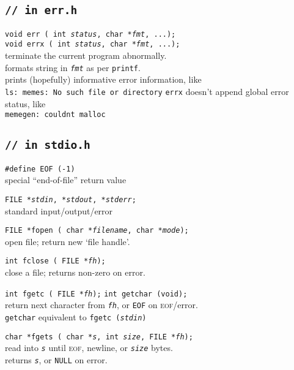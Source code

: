 \documentclass[8pt]{article}
\newcommand{\Cc}[1]{\texttt{#1}}
\newcommand{\cmt}[1]{\textcolor[gray]{.3}{\texttt{#1}}} %
\newcommand{\cpp}[1]{\textcolor{black!20!cyan}{\texttt{\##1}}} %
\newcommand{\ty}[1]{\textcolor{blue!80}{\texttt{#1}}} %
\newcommand{\kv}[1]{\textcolor{red!40!black}{\texttt{#1}}} %
\newcommand{\val}[1]{\texttt{#1}} %
\newcommand{\fn}[1]{\texttt{#1}} %
\newcommand{\var}[1]{\texttt{\textit{#1}}} %
\newcommand{\htab}{\hspace*{2em}} %
\newcommand{\Cq}{\textquotesingle} %
\begin{document}
\begin{multicols}{3}
\subsection*{\Cc{\cmt{// in err.h}}}

\Cc{\ty{void} \fn{err}\,(%
    \ty{int} \var{status}, %
    \ty{char *}\var{fmt}, ...);} \\
\Cc{\ty{void} \fn{errx}\,(%
    \ty{int} \var{status}, %
    \ty{char *}\var{fmt}, ...);} \\
\htab terminate the current program abnormally. \\
\htab formats string in \var{fmt} as per \fn{printf}. \\
\htab prints (hopefully) informative error information, like \\
\htab\htab\texttt{ls: memes: No such file or directory}
\htab \fn{errx} doesn't append global error status, like \\
\htab\htab\texttt{memegen: couldn\Cq t malloc}

\subsection*{\Cc{\cmt{// in stdio.h}}}

\Cc{\cpp{define} \kv{EOF} (\val{-1})} \\
\htab special ``end-of-file'' return value

\Cc{\ty{FILE *}\var{stdin}, \ty{*}\var{stdout}, \ty{*}\var{stderr};}\\
\htab standard input/output/error

\Cc{\ty{FILE *}\fn{fopen}\,(%
    \ty{char *}\var{filename},
    \ty{char *}\var{mode});}\\
\htab open file; return new `file handle'.

\Cc{\ty{int} \fn{fclose}\,(%
    \ty{FILE *}\var{fh});}\\
\htab close a file; returns non-zero on error.

\Cc{\ty{int} \fn{fgetc}\,(%
    \ty{FILE *}\var{fh});}\hfill
\Cc{\ty{int} \fn{getchar}\,(\ty{void});}\\
\htab return next character from \var{fh}, or \kv{EOF} on \textsc{eof}/error. \\
\htab \fn{getchar} equivalent to \Cc{\fn{fgetc}\,(\var{stdin})}

\Cc{\ty{char *}\fn{fgets}\,(%
    \ty{char *}\var{s},
    \ty{int} \var{size},
    \ty{FILE *}\var{fh});}\\
\htab read into \var{s} until \textsc{eof}, newline, or \var{size} bytes. \\
\htab returns \var{s}, or \kv{NULL} on error.


\end{multicols}
\end{document}
